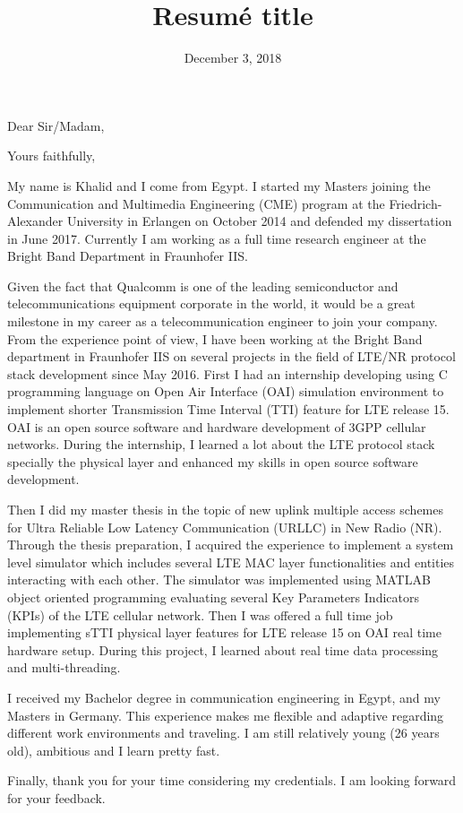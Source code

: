 \documentclass[11pt,a4paper,sans]{moderncv}        %
\title{Resumé title}                               %
\begin{document}
\date{December 3, 2018}
\opening{Dear Sir/Madam,}
\closing{Yours faithfully,}
\makelettertitle

My name is Khalid and I come from Egypt. I started my Masters joining the Communication and Multimedia Engineering (CME) program at the Friedrich-Alexander University in Erlangen on October 2014 and defended my dissertation in June 2017. Currently I am working as a full time research engineer at the Bright Band Department in Fraunhofer IIS. 

Given the fact that Qualcomm is one of the leading semiconductor and telecommunications equipment corporate in the world, it would be a great milestone in my career as a telecommunication engineer to join your company. From the experience point of view, I have been working at the Bright Band department in Fraunhofer IIS on several projects in the field of LTE/NR protocol stack development since May 2016. First I had an internship developing using C programming language on Open Air Interface (OAI) simulation environment to implement shorter Transmission Time Interval (TTI) feature for LTE release 15. OAI is an open source software and hardware development of 3GPP cellular networks. During the internship, I learned a lot about the LTE protocol stack specially the physical layer and enhanced my skills in open source software development. 

Then I did my master thesis in the topic of new uplink multiple access schemes for Ultra Reliable Low Latency Communication (URLLC) in New Radio (NR). Through the thesis preparation, I acquired the experience to implement a system level simulator which includes several LTE MAC layer functionalities and entities interacting with each other. The simulator was implemented using MATLAB object oriented programming evaluating several Key Parameters Indicators (KPIs) of the LTE cellular network. Then I was offered a full time job implementing sTTI physical layer features for LTE release 15 on OAI real time hardware setup. During this project, I learned about real time data processing and multi-threading.  

I received my Bachelor degree in communication engineering in Egypt, and my Masters in Germany. This experience makes me flexible and adaptive regarding different work environments and traveling. I am still relatively young (26 years old), ambitious and I learn pretty fast. 

Finally, thank you for your time considering my credentials. 
I am looking forward for your feedback.

\makeletterclosing
\end{document}
